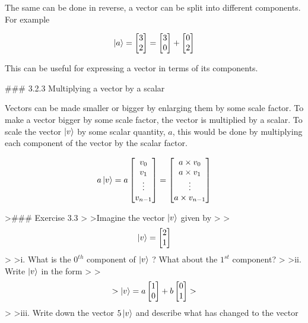 \documentclass{book}
\begin{document}
The same can be done in reverse, a vector can be split into different components. For example 

$$
\ket{a} = \begin{bmatrix} 3 \\ 2 \end{bmatrix} = \begin{bmatrix} 3 \\ 0 \end{bmatrix} + \begin{bmatrix} 0 \\ 2 \end{bmatrix}
$$

This can be useful for expressing a vector in terms of its components. 

### 3.2.3 Multiplying a vector by a scalar 

Vectors can be made smaller or bigger by enlarging them by some scale factor. To make a vector bigger by some scale factor, the vector is multiplied by a scalar. To scale the vector $\ket{v}$ by some scalar quantity, $a$, this would be done by multiplying each component of the vector by the scalar factor. 

$$
a \ket{v} = a\begin{bmatrix} v_0 \\ v_1 \\ \vdots \\ v_{n-1} \end{bmatrix} = \begin{bmatrix} a \times v_0 \\ a \times v_1 \\ \vdots \\ a \times v_{n-1} \end{bmatrix} 
$$

>### Exercise 3.3
>
>Imagine the vector $\ket{v}$ given by 
>
>$$\ket{v} = \begin{bmatrix} 2 \\ 1 \end{bmatrix}$$
>
>i. What is the $0^{th}$ component of $\ket{v}$ ? What about the $1^{st}$ component?
>
>ii. Write $\ket{v}$ in the form 
>
>$$
>\ket{v} = a\begin{bmatrix} 1 \\ 0 \end{bmatrix} + b \begin{bmatrix} 0 \\ 1 \end{bmatrix}
>$$
>
>iii. Write down the vector $5\ket{v}$ and describe what has changed to the vector
\end{document}
